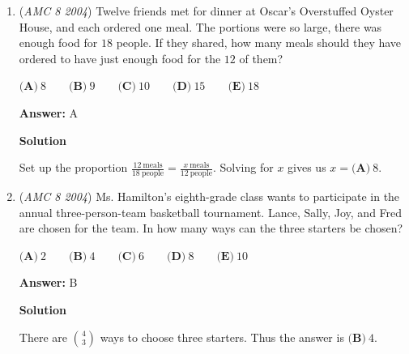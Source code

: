 \begin{enumerate}
\textbf{Solution  2}

Note that the four-digit number must start with either a $2$ or a $4$. The four-digit numbers that start with $2$ are $2400, 2040$, and $2004$. The four-digit numbers that start with $4$ are $4200, 4020$, and $4002$ which gives us a total of $\boxed{\textbf{(B)}\ 6}$.

 



\textbf{Solution 3}

In order for the resulting numbers to have four digits, they cannot start with $0$. Therefore, both zeroes must be in the last three places. There are $\binom32=3$ ways to choose which two of the last three places are zeroes. Then there are $2\cdot1=2$ ways to arrange the $2$ and the $4$ in the remaining two places, giving us a total of $3\cdot2=\boxed{\textbf{(B)}\ 6}$.

 


	\item (\textit{AMC 8 2004}) Twelve friends met for dinner at Oscar's Overstuffed Oyster House, and each ordered one meal. The portions were so large, there was enough food for $18$ people. If they shared, how many meals should they have ordered to have just enough food for the $12$ of them?


 $\textbf{(A)}\ 8\qquad\textbf{(B)}\ 9\qquad\textbf{(C)}\ 10\qquad\textbf{(D)}\ 15\qquad\textbf{(E)}\ 18$

 \textbf{Answer: }A



\textbf{Solution}

Set up the proportion $\frac{12\ \text{meals}}{18\ \text{people}}=\frac{x\ \text{meals}}{12\ \text{people}}$. Solving for $x$ gives us $x= \boxed{\textbf{(A)}\ 8}$.

 


	\item (\textit{AMC 8 2004}) Ms. Hamilton’s eighth-grade class wants to participate in the annual three-person-team basketball tournament. Lance, Sally, Joy, and Fred are chosen for the team. In how many ways can the three starters be chosen?


 $\textbf{(A)}\ 2\qquad\textbf{(B)}\ 4\qquad\textbf{(C)}\ 6\qquad\textbf{(D)}\ 8\qquad\textbf{(E)}\ 10$

 \textbf{Answer: }B



\textbf{Solution}

There are $\binom{4}{3}$ ways to choose three starters. Thus the answer is $\boxed{\textbf{(B)}\ 4}$.


\end{enumerate}
